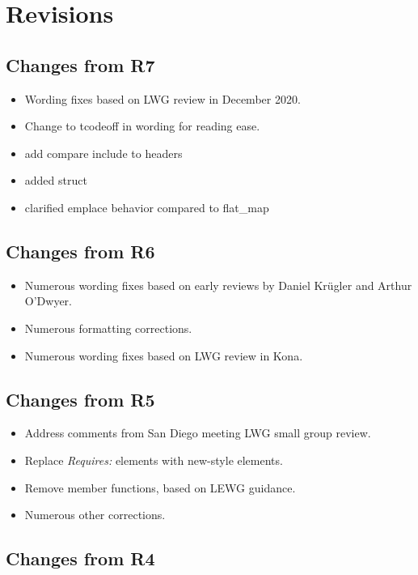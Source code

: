 \section{Revisions}

\subsection{Changes from R7}

\begin{itemize}
  \item Wording fixes based on LWG review in December 2020.
  \item Change  to tcode{off} in wording for reading ease.
  \item add compare include to headers
  \item added  struct
  \item clarified  emplace behavior compared to {flat_map}
\end{itemize}

\subsection{Changes from R6}

\begin{itemize}
  \item Numerous wording fixes based on early reviews by Daniel Kr{\"u}gler and Arthur O'Dwyer.
  \item Numerous formatting corrections.
  \item Numerous wording fixes based on LWG review in Kona.
\end{itemize}

\subsection{Changes from R5}

\begin{itemize}
  \item Address comments from San Diego meeting LWG small group review.
  \item Replace \textit{Requires:} elements with new-style elements.
  \item Remove  member functions, based on LEWG guidance.
  \item Numerous other corrections.
\end{itemize}

\subsection{Changes from R4}

